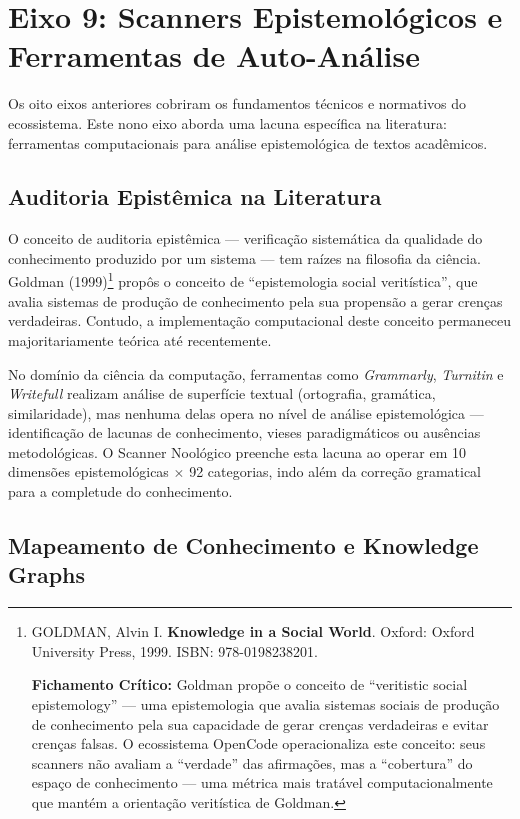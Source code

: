 \section{Eixo 9: Scanners Epistemológicos e Ferramentas de Auto-Análise}

Os oito eixos anteriores cobriram os fundamentos técnicos e normativos do ecossistema. Este nono eixo aborda uma lacuna específica na literatura: ferramentas computacionais para análise epistemológica de textos acadêmicos.

\subsection{Auditoria Epistêmica na Literatura}

O conceito de auditoria epistêmica --- verificação sistemática da qualidade do conhecimento produzido por um sistema --- tem raízes na filosofia da ciência. Goldman (1999)\footnote{
  GOLDMAN, Alvin I. \textbf{Knowledge in a Social World}. Oxford: Oxford University Press, 1999. ISBN: 978-0198238201.

  \textbf{Fichamento Crítico:} Goldman propõe o conceito de ``veritistic social epistemology'' --- uma epistemologia que avalia sistemas sociais de produção de conhecimento pela sua capacidade de gerar crenças verdadeiras e evitar crenças falsas. O ecossistema OpenCode operacionaliza este conceito: seus scanners não avaliam a ``verdade'' das afirmações, mas a ``cobertura'' do espaço de conhecimento --- uma métrica mais tratável computacionalmente que mantém a orientação veritística de Goldman.
} propôs o conceito de ``epistemologia social veritística'', que avalia sistemas de produção de conhecimento pela sua propensão a gerar crenças verdadeiras. Contudo, a implementação computacional deste conceito permaneceu majoritariamente teórica até recentemente.

No domínio da ciência da computação, ferramentas como \textit{Grammarly}, \textit{Turnitin} e \textit{Writefull} realizam análise de superfície textual (ortografia, gramática, similaridade), mas nenhuma delas opera no nível de análise epistemológica --- identificação de lacunas de conhecimento, vieses paradigmáticos ou ausências metodológicas. O Scanner Noológico preenche esta lacuna ao operar em 10 dimensões epistemológicas $\times$ 92 categorias, indo além da correção gramatical para a completude do conhecimento.

\subsection{Mapeamento de Conhecimento e Knowledge Graphs}

